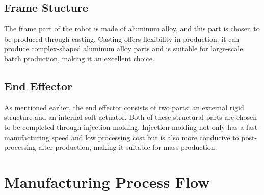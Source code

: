 \documentclass[10pt, a4paper, twocolumn]{article}
\begin{document}
\subsection{Frame Stucture}
The frame part of the robot is made of aluminum alloy, and this part is chosen to be produced through casting. Casting offers flexibility in production: it can produce complex-shaped aluminum alloy parts and is suitable for large-scale batch production, making it an excellent choice.

\subsection{End Effector}
As mentioned earlier, the end effector consists of two parts: an external rigid structure and an internal soft actuator. Both of these structural parts are chosen to be completed through injection molding. Injection molding not only has a fast manufacturing speed and low processing cost but is also more conducive to post-processing after production, making it suitable for mass production.

\section{Manufacturing Process Flow}
\end{document}
